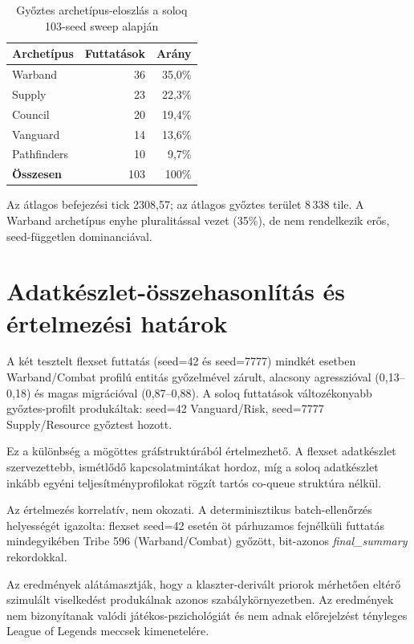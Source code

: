 \begin{table}[H]
\centering
\caption{Győztes archetípus-eloszlás a soloq 103-seed sweep alapján}
\label{tab:soloq-sweep-archetypes}
\begin{tabular}{lrr}
\toprule
\textbf{Archetípus} & \textbf{Futtatások} & \textbf{Arány} \\
\midrule
Warband   & 36 & 35{,}0\% \\
Supply    & 23 & 22{,}3\% \\
Council   & 20 & 19{,}4\% \\
Vanguard  & 14 & 13{,}6\% \\
Pathfinders & 10 & 9{,}7\% \\
\midrule
\textbf{Összesen} & 103 & 100\% \\
\bottomrule
\end{tabular}
\end{table}

Az átlagos befejezési tick 2308{,}57; az átlagos győztes terület 8\,338 tile. A Warband archetípus enyhe pluralitással vezet (35\%), de nem rendelkezik erős, seed-független dominanciával.

\section{Adatkészlet-összehasonlítás és értelmezési határok}

A két tesztelt flexset futtatás (seed=42 és seed=7777) mindkét esetben Warband/Combat profilú entitás győzelmével zárult, alacsony agresszióval (0{,}13--0{,}18) és magas migrációval (0{,}87--0{,}88). A soloq futtatások változékonyabb győztes-profilt produkáltak: seed=42 Vanguard/Risk, seed=7777 Supply/Resource győztest hozott.

Ez a különbség a mögöttes gráfstruktúrából értelmezhető. A flexset adatkészlet szervezettebb, ismétlődő kapcsolatmintákat hordoz, míg a soloq adatkészlet inkább egyéni teljesítményprofilokat rögzít tartós co-queue struktúra nélkül.

Az értelmezés korrelatív, nem okozati. A determinisztikus batch-ellenőrzés helyességét igazolta: flexset seed=42 esetén öt párhuzamos fejnélküli futtatás mindegyikében Tribe 596 (Warband/Combat) győzött, bit-azonos \textit{final\_summary} rekordokkal.

Az eredmények alátámasztják, hogy a klaszter-derivált priorok mérhetően eltérő szimulált viselkedést produkálnak azonos szabálykörnyezetben. Az eredmények nem bizonyítanak valódi játékos-pszichológiát és nem adnak előrejelzést tényleges League of Legends meccsek kimenetelére.

